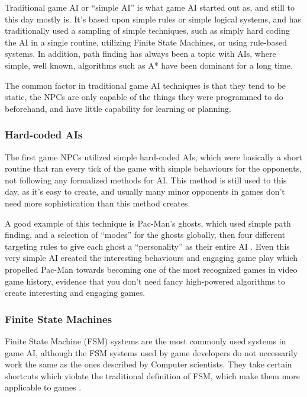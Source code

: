 \documentclass[]{report}
\begin{document}
Traditional game AI or ``simple AI'' is what game AI started out as, and still
to this day mostly is. It's based upon simple rules or simple logical systems,
and has traditionally used a sampling of simple techniques, such as simply hard
coding the AI in a single routine, utilizing Finite State Machines, or using
rule-based systems. In addition, path finding has always been a topic with AIs,
where simple, well known, algorithms such as A* have been dominant for a long
time.

The common factor in traditional game AI techniques is that they tend to be
static, the NPCs are only capable of the things they were programmed to do
beforehand, and have little capability for learning or planning.

\subsubsection{Hard-coded AIs}
\label{sec:hard-coded-ais}

The first game NPCs utilized simple hard-coded AIs, which were basically a short
routine that ran every tick of the game with simple behaviours for the
opponents, not following any formalized methods for AI. This method is still
used to this day, as it's easy to create, and usually many minor opponents in
games don't need more sophistication than this method creates.

A good example of this technique is Pac-Man's ghosts, which used simple path
finding, and a selection of ``modes'' for the ghosts globally, then four
different targeting rules to give each ghost a ``personality'' as their entire
AI \citep{birch2010pacman,pittmanpac}. Even this very simple AI created the
interesting behaviours and engaging game play which propelled Pac-Man towards
becoming one of the most recognized games in video game history, evidence that
you don't need fancy high-powered algorithms to create interesting and engaging
games.

\subsubsection{Finite State Machines}
\label{sec:finite-state-mach}

Finite State Machine (FSM) systems are the most commonly used systems in game
AI, although the FSM systems used by game developers do not necessarily work the
same as the ones described by Computer scientists. They take certain shortcuts
which violate the traditional definition of FSM, which make them more applicable
to games \citep{rabin2002implementing}.
\end{document}
